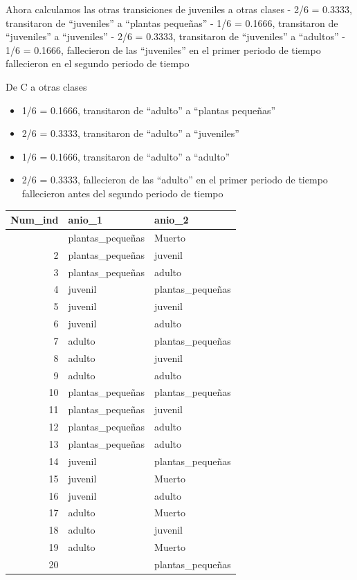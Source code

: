 \documentclass[
]{book}
\providecommand{\tightlist}{%
  \setlength{\itemsep}{0pt}\setlength{\parskip}{0pt}}
\theoremstyle{definition}
\theoremstyle{definition}
\theoremstyle{definition}
\theoremstyle{definition}
\theoremstyle{remark}
\begin{document}
Ahora calculamos las otras transiciones de juveniles a otras clases - 2/6 = 0.3333, transitaron de ``juveniles'' a ``plantas pequeñas'' - 1/6 = 0.1666, transitaron de ``juveniles'' a ``juveniles'' - 2/6 = 0.3333, transitaron de ``juveniles'' a ``adultos'' - 1/6 = 0.1666, fallecieron de las ``juveniles'' en el primer periodo de tiempo fallecieron en el segundo periodo de tiempo

De C a otras clases

\begin{itemize}
\tightlist
\item
  1/6 = 0.1666, transitaron de ``adulto'' a ``plantas pequeñas''
\item
  2/6 = 0.3333, transitaron de ``adulto'' a ``juveniles''
\item
  1/6 = 0.1666, transitaron de ``adulto'' a ``adulto''
\item
  2/6 = 0.3333, fallecieron de las ``adulto'' en el primer periodo de tiempo fallecieron antes del segundo periodo de tiempo
\end{itemize}

\begin{longtable}{rll}
\toprule
Num\_ind & anio\_1 & anio\_2 \\ 
\midrule\addlinespace[2.5pt]
1 & plantas\_pequeñas & Muerto \\ 
2 & plantas\_pequeñas & juvenil \\ 
3 & plantas\_pequeñas & adulto \\ 
4 & juvenil & plantas\_pequeñas \\ 
5 & juvenil & juvenil \\ 
6 & juvenil & adulto \\ 
7 & adulto & plantas\_pequeñas \\ 
8 & adulto & juvenil \\ 
9 & adulto & adulto \\ 
10 & plantas\_pequeñas & plantas\_pequeñas \\ 
11 & plantas\_pequeñas & juvenil \\ 
12 & plantas\_pequeñas & adulto \\ 
13 & plantas\_pequeñas & adulto \\ 
14 & juvenil & plantas\_pequeñas \\ 
15 & juvenil & Muerto \\ 
16 & juvenil & adulto \\ 
17 & adulto & Muerto \\ 
18 & adulto & juvenil \\ 
19 & adulto & Muerto \\ 
20 &  & plantas\_pequeñas \\ 
\bottomrule
\end{longtable}
\end{document}
